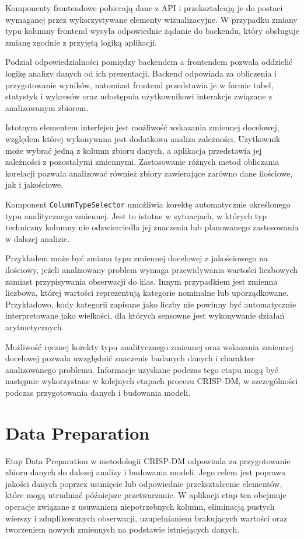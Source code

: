 \documentclass[12pt]{book}
\begin{document}
Komponenty frontendowe pobierają dane z API i przekształcają
je do postaci wymaganej przez wykorzystywane elementy
wizualizacyjne. W przypadku zmiany typu kolumny frontend
wysyła odpowiednie żądanie do backendu, który obsługuje
zmianę zgodnie z przyjętą logiką aplikacji.

Podział odpowiedzialności pomiędzy backendem a frontendem
pozwala oddzielić logikę analizy danych od ich prezentacji.
Backend odpowiada za obliczenia i przygotowanie wyników,
natomiast frontend przedstawia je w formie tabel, statystyk
i wykresów oraz udostępnia użytkownikowi interakcje
związane z analizowanym zbiorem.

Istotnym elementem interfejsu jest możliwość wskazania zmiennej docelowej,
względem której wykonywana jest dodatkowa analiza zależności.
Użytkownik może wybrać jedną z kolumn zbioru danych,
a aplikacja przedstawia jej zależności z pozostałymi zmiennymi.
Zastosowanie różnych metod obliczania korelacji pozwala analizować
również zbiory zawierające zarówno dane ilościowe, jak i jakościowe.

Komponent \texttt{ColumnTypeSelector} umożliwia korektę
automatycznie określonego typu analitycznego zmiennej.
Jest to istotne w sytuacjach, w których typ techniczny kolumny
nie odzwierciedla jej znaczenia lub planowanego zastosowania
w dalszej analizie.

Przykładem może być zmiana typu zmiennej docelowej z jakościowego na ilościowy,
jeżeli analizowany problem wymaga przewidywania wartości liczbowych zamiast
przypisywania obserwacji do klas. Innym przypadkiem jest zmienna liczbowa,
której wartości reprezentują kategorie nominalne lub uporządkowane.
Przykładowo, kody kategorii zapisane jako liczby nie powinny być
automatycznie interpretowane jako wielkości, dla których sensowne
jest wykonywanie działań arytmetycznych.

Możliwość ręcznej korekty typu analitycznego zmiennej oraz wskazania zmiennej docelowej
pozwala uwzględnić znaczenie badanych danych i charakter analizowanego problemu.
Informacje uzyskane podczas tego etapu mogą być następnie wykorzystane w kolejnych etapach
procesu CRISP-DM, w szczególności podczas przygotowania danych i budowania modeli.

\section{Data Preparation}

Etap Data Preparation w metodologii CRISP-DM odpowiada za
przygotowanie zbioru danych do dalszej analizy i budowania modeli.
Jego celem jest poprawa jakości danych poprzez usunięcie lub
odpowiednie przekształcenie elementów, które mogą utrudniać
późniejsze przetwarzanie. W aplikacji etap ten obejmuje operacje
związane z usuwaniem niepotrzebnych kolumn, eliminacją pustych
wierszy i zduplikowanych obserwacji, uzupełnianiem brakujących
wartości oraz tworzeniem nowych zmiennych na podstawie
istniejących danych.
\end{document}

